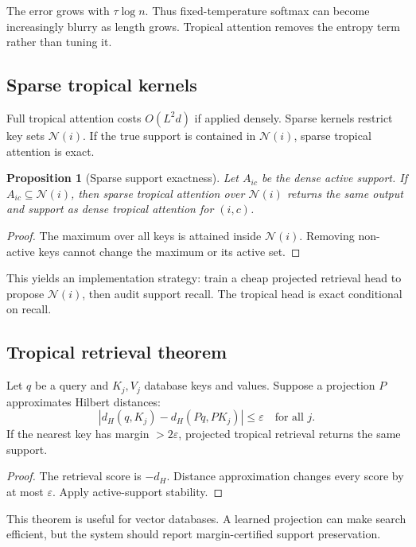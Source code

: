 \documentclass[11pt]{article}
\newtheorem{proposition}[definition]{Proposition}
\newcommand{\calN}{\mathcal{N}}
\newcommand{\eps}{\varepsilon}
\begin{document}
The error grows with \(\tau\log n\).  Thus fixed-temperature softmax can become increasingly blurry as length grows.  Tropical attention removes the entropy term rather than tuning it.

\subsection{Sparse tropical kernels}

Full tropical attention costs \(O(L^2d)\) if applied densely.  Sparse kernels restrict key sets \(\calN(i)\).  If the true support is contained in \(\calN(i)\), sparse tropical attention is exact.

\begin{proposition}[Sparse support exactness]
Let \(A_{ic}\) be the dense active support.  If \(A_{ic}\subseteq\calN(i)\), then sparse tropical attention over \(\calN(i)\) returns the same output and support as dense tropical attention for \((i,c)\).
\end{proposition}
\begin{proof}
The maximum over all keys is attained inside \(\calN(i)\).  Removing non-active keys cannot change the maximum or its active set.
\end{proof}

This yields an implementation strategy: train a cheap projected retrieval head to propose \(\calN(i)\), then audit support recall.  The tropical head is exact conditional on recall.

\subsection{Tropical retrieval theorem}

Let \(q\) be a query and \(K_j,V_j\) database keys and values.  Suppose a projection \(P\) approximates Hilbert distances:
\begin{equation}
|d_H(q,K_j)-d_H(Pq,PK_j)|\le\eps\quad\text{for all }j.
\end{equation}
If the nearest key has margin \(>2\eps\), projected tropical retrieval returns the same support.

\begin{proof}
The retrieval score is \(-d_H\).  Distance approximation changes every score by at most \(\eps\).  Apply active-support stability.
\end{proof}

This theorem is useful for vector databases.  A learned projection can make search efficient, but the system should report margin-certified support preservation.
\end{document}
